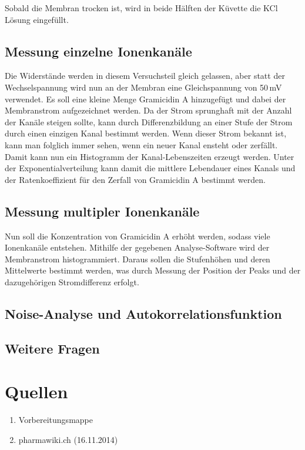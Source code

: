 \documentclass[a4paper,ngerman]{scrartcl}
\begin{document}
Sobald die Membran trocken ist, wird in beide Hälften der Küvette die KCl Lösung eingefüllt.

\subsection{Messung einzelne Ionenkanäle}
\label{sec:singlechannels}
Die Widerstände werden in diesem Versuchsteil gleich gelassen, aber statt der Wechselspannung wird nun an der Membran eine Gleichspannung 
von 50\,mV verwendet. Es soll eine kleine Menge Gramicidin A hinzugefügt und dabei der Membranstrom aufgezeichnet werden. Da der Strom 
sprunghaft mit der Anzahl der Kanäle steigen sollte, kann durch Differenzbildung an einer Stufe der Strom durch einen einzigen Kanal bestimmt werden. Wenn dieser Strom bekannt ist, kann man folglich immer sehen, wenn ein neuer Kanal ensteht oder zerfällt.\\

Damit kann nun ein Histogramm der Kanal-Lebenszeiten erzeugt werden. Unter der Exponentialverteilung kann damit die mittlere Lebendauer 
eines Kanals und der Ratenkoeffizient für den Zerfall von Gramicidin A bestimmt werden.

\subsection{Messung multipler Ionenkanäle}
\label{sec:multiplechannels}
Nun soll die Konzentration von Gramicidin A erhöht werden, sodass viele Ionenkanäle entstehen. Mithilfe der gegebenen Analyse-Software
wird der Membranstrom histogrammiert. Daraus sollen die Stufenhöhen und deren Mittelwerte bestimmt werden, was durch Messung der Position der Peaks und der dazugehörigen Stromdifferenz erfolgt.

\subsection{Noise-Analyse und Autokorrelationsfunktion}
\label{sec:noise-autocorr}

\subsection{Weitere Fragen}
\label{sec:weitere-fragen}















\section{Quellen}
\begin{enumerate}
\item Vorbereitungsmappe \label{ref:mappe}
\item pharmawiki.ch (16.11.2014) \label{ref:pharmawiki}
\end{enumerate}
\end{document}
